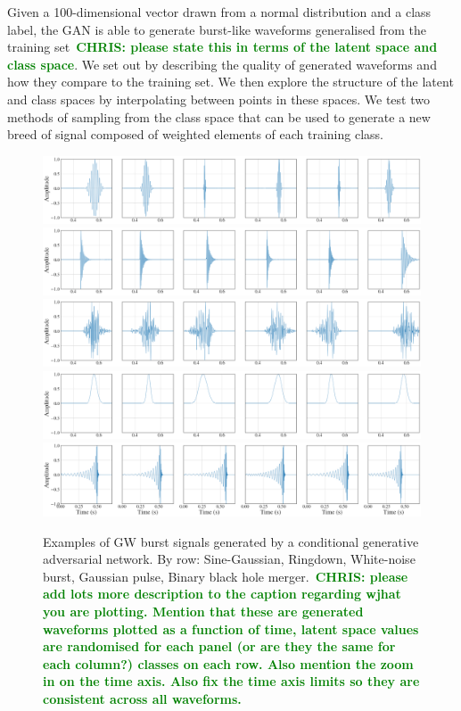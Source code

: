 \documentclass[12pt]{iopart}
\newcommand{\chris}[1]{\textbf{\textcolor{green}{CHRIS: #1}}}
\begin{document}
%
Given a 100-dimensional vector drawn from a normal distribution and a class
label, the GAN is able to generate burst-like waveforms generalised from the
training set~\chris{please state this in terms of the latent space and class
space}. We set out by describing the quality of generated waveforms and
how they compare to the training set. We then explore the structure of the
latent and class spaces by interpolating between points in these spaces. We
test two methods of sampling from the class space that can be used to generate
a new breed of signal composed of weighted elements of each training class.


\begin{figure}
    \centering
    \includegraphics[width=\textwidth]{figures/generations/sg.png}
    \includegraphics[width=\textwidth]{figures/generations/rd.png}
    \includegraphics[width=\textwidth]{figures/generations/wnb.png}
    \includegraphics[width=\textwidth]{figures/generations/blip.png}
    \includegraphics[width=\textwidth]{figures/generations/bbh.png}
    \caption{Examples of \ac{GW} burst signals generated by a conditional generative adversarial network. By row: Sine-Gaussian, Ringdown,
White-noise burst, Gaussian pulse, Binary black hole merger.~\chris{please add
lots more description to the caption regarding wjhat you are plotting. Mention
that these are generated waveforms plotted as a function of time, latent space
values are randomised for each panel (or are they the same for each column?)
classes on each row. Also mention the zoom in on the time axis. Also fix the
time axis limits so they are consistent across all waveforms.}}
\label{fig:gen_signals} 
\end{figure}
\end{document}
